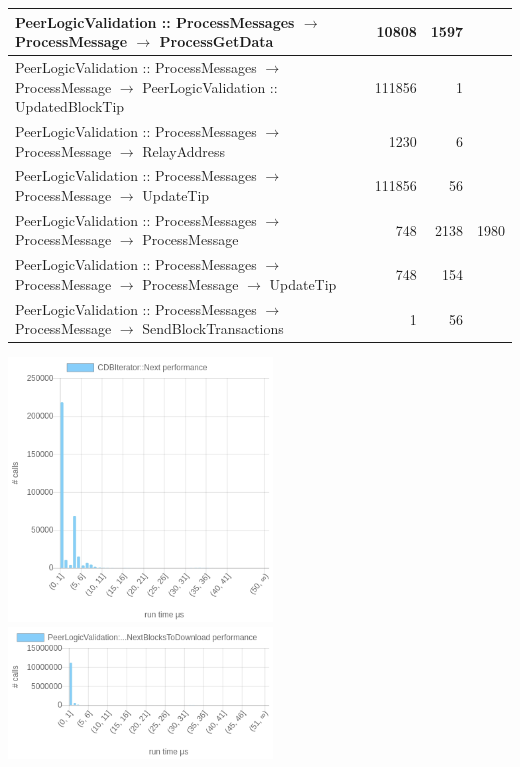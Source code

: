 \documentclass{article}
\begin{document}
\begin{longtable}{P{8cm}|r|r|r}
	PeerLogicValidation :: ProcessMessages $\to$ ProcessMessage $\to$ ProcessGetData& 10808& 1597&\\\hline
	PeerLogicValidation :: ProcessMessages $\to$ ProcessMessage $\to$ PeerLogicValidation :: UpdatedBlockTip& 111856& 1&\\\hline
	PeerLogicValidation :: ProcessMessages $\to$ ProcessMessage $\to$ RelayAddress& 1230& 6&\\\hline
	PeerLogicValidation :: ProcessMessages $\to$ ProcessMessage $\to$ UpdateTip& 111856& 56&\\\hline
	PeerLogicValidation :: ProcessMessages $\to$ ProcessMessage $\to$ ProcessMessage& 748& 2138&1980\\\hline
	PeerLogicValidation :: ProcessMessages $\to$ ProcessMessage $\to$ ProcessMessage $\to$ UpdateTip& 748& 154&\\\hline
	PeerLogicValidation :: ProcessMessages $\to$ ProcessMessage $\to$ SendBlockTransactions& 1& 56&\\\hline
\end{longtable}


\includegraphics[width=7cm]{images/mumbai/chartCDBIterator_3A_3ANext.png}
\includegraphics[width=7cm]{images/mumbai/chartPeerLogicValidation_3A_3ASendMessages-_3EFindNextBlocksToDownload.png}
\end{document}
